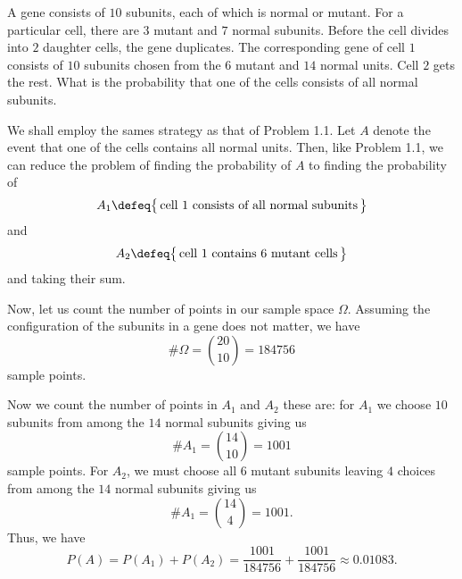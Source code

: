\begin{problem}
  A gene consists of \(10\) subunits, each of which is normal or
  mutant. For a particular cell, there are \(3\) mutant and \(7\) normal
  subunits. Before the cell divides into \(2\) daughter cells, the gene
  duplicates. The corresponding gene of cell \(1\) consists of \(10\)
  subunits chosen from the \(6\) mutant and \(14\) normal units. Cell \(2\)
  gets the rest. What is the probability that one of the cells consists of
  all normal subunits.
\end{problem}
\begin{solution}
  We shall employ the sames strategy as that of Problem 1.1. Let \(A\)
  denote the event that one of the cells contains all normal units. Then,
  like Problem 1.1, we can reduce the problem of finding the probability of
  \(A\) to finding the probability of
  \[
    A_1\defeq\bigl\{\,\text{cell \(1\) consists of all normal subunits}\,\bigr\}
  \]
  and
  \[
    A_2\defeq\bigl\{\,\text{cell \(1\) contains \(6\) mutant cells}\,\bigr\}
  \]
  and taking their sum.

  Now, let us count the number of points in our sample space
  \(\Omega\). Assuming the configuration of the subunits in a gene does not
  matter, we have
  \begin{equation}
    \label{eq:1-4}
      \#\Omega=\binom{20}{10}=184756
  \end{equation}
  sample points.

  Now we count the number of points in \(A_1\) and \(A_2\) these are: for
  \(A_1\) we choose \(10\) subunits from among the \(14\) normal subunits
  giving us
  \begin{equation}
    \label{eq:1-5}
    \# A_1=\binom{14}{10}=1001
  \end{equation}
  sample points. For \(A_2\), we must choose all \(6\) mutant subunits
  leaving \(4\) choices from among the \(14\) normal subunits giving us
  \begin{equation}
    \label{eq:1-6}
    \# A_1=\binom{14}{4}=1001.
  \end{equation}
  Thus, we have
  \[
    P(A)=%
    P(A_1)+P(A_2)=%
    \frac{1001}{184756}+\frac{1001}{184756}\approx%
    0.01083.
  \]
\end{solution}
\newpage

